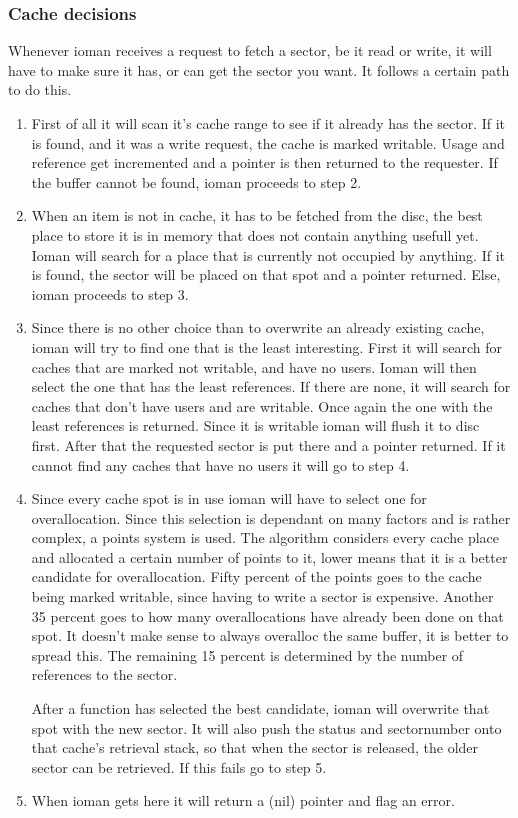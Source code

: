 \subsubsection{Cache decisions}
Whenever ioman receives a request to fetch a sector, be it read or write, it will have to make sure
it has, or can get the sector you want. It follows a certain path to do this.\label{cachemethod}
\begin{enumerate}
	\item First of all it will scan it's cache range to see if it already has the sector.
		If it is found, and it was a write request, the cache is marked writable. Usage and
		reference get incremented and a pointer	is then returned to the requester. If the
		buffer cannot be found, ioman proceeds to step 2.
	\item When an item is not in cache, it has to be fetched from the disc, the best place to
		store it is in memory that does not contain anything usefull yet. Ioman will search for
		a place that is currently not occupied by anything. If it is found, the sector will be 
		placed on that spot and a pointer returned. Else, ioman proceeds to step 3.
	\item Since there is no other choice than to overwrite an already existing cache, ioman will
		try to find one that is the least interesting. First it will search for caches that
		are marked not writable, and have no users. Ioman will then select the one that has the
		least references. If there are none, it will search for caches that don't have users and
		are writable. Once again the one with the least references is returned. Since it is 
		writable ioman will flush it to disc first. After that the requested sector is put there
		and a pointer returned. If it cannot find any caches that have no users it will go to
		step 4.
	\item Since every cache spot is in use ioman will have to select one for overallocation.
		Since this selection is dependant on many factors and is rather complex, a points
		system is used. The algorithm considers every cache place and allocated a certain number
		of points to it, lower means that it is a better candidate for overallocation. Fifty 
		percent of the points goes to the cache being marked writable, since having to write
		a sector is expensive. Another 35 percent goes to how many overallocations have 
		already been done on that spot. It doesn't make sense to always overalloc the same buffer,
		it is better to spread this. The remaining 15 percent is determined by the number of 
		references to the sector. 
		
		After a function has selected the best candidate, ioman will overwrite that spot with
		the new sector. It will also push the status and sectornumber onto that cache's 
		retrieval stack, so that when the sector is released, the older sector can be retrieved.
		If this fails go to step 5.
	\item When ioman gets here it will return a (nil) pointer and flag an error.
\end{enumerate}

